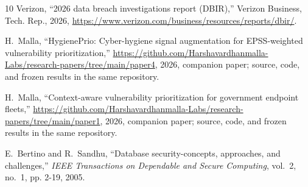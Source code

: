 \documentclass[journal]{IEEEtran}
\begin{document}
\begin{thebibliography}{10}
{Verizon}, ``2026 data breach investigations report ({DBIR}),'' Verizon
  Business, Tech. Rep., 2026,
  \url{https://www.verizon.com/business/resources/reports/dbir/}.

H.~Malla, ``{HygienePrio}: Cyber-hygiene signal augmentation for
  {EPSS}-weighted vulnerability prioritization,''
  \url{https://github.com/Harshavardhanmalla-Labs/research-papers/tree/main/paper4},
  2026, companion paper; source, code, and frozen results in the same
  repository.

H.~Malla, ``Context-aware vulnerability prioritization for government endpoint
  fleets,''
  \url{https://github.com/Harshavardhanmalla-Labs/research-papers/tree/main/paper1},
  2026, companion paper; source, code, and frozen results in the same
  repository.

E.~Bertino and R.~Sandhu, ``Database security-concepts, approaches, and
  challenges,'' \emph{{IEEE} Transactions on Dependable and Secure Computing},
  vol.~2, no.~1, pp. 2-19, 2005.

\end{thebibliography}
\end{document}
